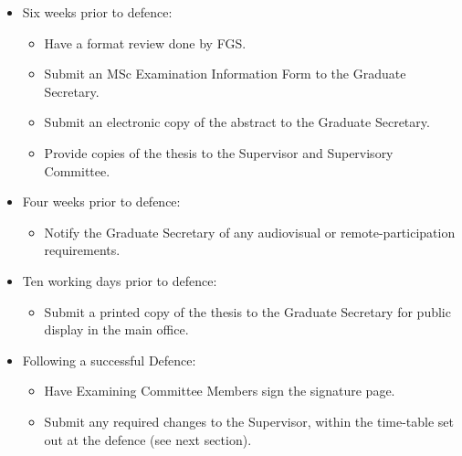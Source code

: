 \documentclass[12pt]{article}
\newcommand{\supervisor}{Supervisor\xspace}
\newcommand{\supcom}{Supervisory Committee\xspace}
\newcommand{\GS}{Graduate Secretary\xspace}
\newcommand{\FGS}{FGS\xspace}
\begin{document}
\begin{itemize}
    \item Six weeks prior to defence:

        \begin{itemize}

            \item Have a format review done by \FGS.

            \item Submit an MSc Examination Information Form to the \GS.

            \item Submit an electronic copy of the abstract to the \GS.

            \item Provide copies of the thesis to the \supervisor and \supcom.

        \end{itemize}

    \item Four weeks prior to defence:

        \begin{itemize}

            \item Notify the \GS of any audiovisual or remote-participation requirements.

        \end{itemize}

    \item Ten working days prior to defence:
        \begin{itemize}

            \item Submit a printed copy of the thesis to the \GS for public
                display in the main office.

        \end{itemize}

    \item Following a successful Defence:

        \begin{itemize}

            \item Have Examining Committee Members sign the signature
                page.

            \item Submit any required changes to the \supervisor, within the
                time-table set out at the defence (see next section).


\end{itemize}
\end{itemize}
\end{document}
